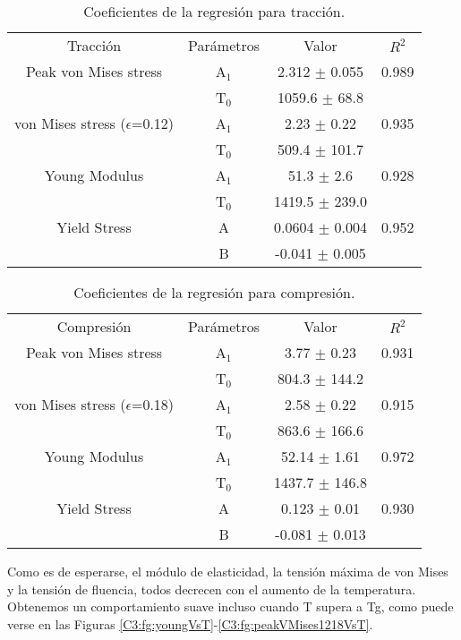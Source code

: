 \begin{table}[htp]
\caption[Coeficientes de la regresión para tracción.]{Coeficientes de la regresión para tracción.}
\begin{center}
\begin{tabular}{*{4}{c}}
Tracción & Parámetros & Valor & $R^{2}$ \\
Peak von Mises stress & A$_{1}$ & 2.312 $\pm$ 0.055 & 0.989 \\
 & T$_{0}$ & 1059.6 $\pm$ 68.8 & \\
von Mises stress ($\epsilon$=0.12) & A$_{1}$ & 2.23 $\pm$ 0.22 & 0.935 \\
 & T$_{0}$ & 509.4 $\pm$ 101.7 & \\
Young Modulus & A$_{1}$ & 51.3 $\pm$ 2.6 & 0.928 \\
 & T$_{0}$ & 1419.5 $\pm$ 239.0 & \\
Yield Stress & A & 0.0604 $\pm$ 0.004 & 0.952 \\
 & B & -0.041 $\pm$ 0.005 & 
\end{tabular}
\end{center}
\label{C3:tb:initPropsTen}
\end{table}

\begin{table}[htp]
\caption[Coeficientes de la regresión para compresión.]{Coeficientes de la regresión para compresión.}
\begin{center}
\begin{tabular}{*{4}{c}}
Compresión & Parámetros & Valor & $R^{2}$ \\
Peak von Mises stress & A$_{1}$ & 3.77 $\pm$ 0.23 & 0.931 \\
 & T$_{0}$ & 804.3 $\pm$ 144.2 & \\
von Mises stress ($\epsilon$=0.18) & A$_{1}$ & 2.58 $\pm$ 0.22 & 0.915 \\
 & T$_{0}$ & 863.6 $\pm$ 166.6 & \\
Young Modulus & A$_{1}$ & 52.14 $\pm$ 1.61 & 0.972 \\
 & T$_{0}$ & 1437.7 $\pm$ 146.8 & \\
Yield Stress & A & 0.123 $\pm$ 0.01 & 0.930 \\
 & B & -0.081 $\pm$ 0.013 & 
\end{tabular}
\end{center}
\label{C3:tb:initPropsComp}
\end{table}

Como es de esperarse, el módulo de elasticidad, la tensión máxima de von Mises y la tensión de fluencia, todos decrecen con el aumento de la temperatura. Obtenemos un comportamiento suave incluso cuando T supera a Tg, como puede verse en las Figuras \ref{C3:fg:youngVsT}-\ref{C3:fg:peakVMises1218VsT}.

